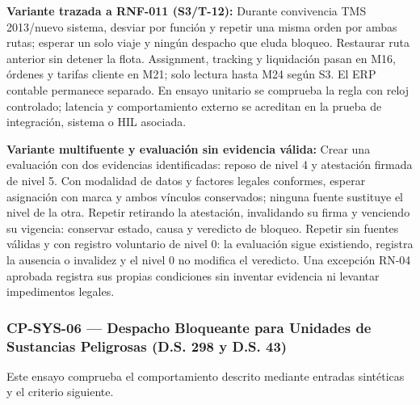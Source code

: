 \par\noindent\textbf{Variante trazada a RNF-011 (S3/T-12):} Durante convivencia TMS 2013/nuevo sistema, desviar por función y repetir una misma orden por ambas rutas; esperar un solo viaje y ningún despacho que eluda bloqueo. Restaurar ruta anterior sin detener la flota. Assignment, tracking y liquidación pasan en M16, órdenes y tarifas cliente en M21; solo lectura hasta M24 según S3. El ERP contable permanece separado. En ensayo unitario se comprueba la regla con reloj controlado; latencia y comportamiento externo se acreditan en la prueba de integración, sistema o HIL asociada.\par



\par\noindent\textbf{Variante multifuente y evaluación sin evidencia válida:} Crear una evaluación con dos evidencias identificadas: reposo de nivel 4 y atestación firmada de nivel 5. Con modalidad de datos y factores legales conformes, esperar asignación con marca y ambos vínculos conservados; ninguna fuente sustituye el nivel de la otra. Repetir retirando la atestación, invalidando su firma y venciendo su vigencia: conservar estado, causa y veredicto de bloqueo. Repetir sin fuentes válidas y con registro voluntario de nivel 0: la evaluación sigue existiendo, registra la ausencia o invalidez y el nivel 0 no modifica el veredicto. Una excepción RN-04 aprobada registra sus propias condiciones sin inventar evidencia ni levantar impedimentos legales.\par


\subsubsection*{CP-SYS-06 — Despacho Bloqueante para Unidades de Sustancias Peligrosas (D.S. 298 y D.S. 43)}\label{sec:9-cp-sys-06}
Este ensayo comprueba el comportamiento descrito mediante entradas sintéticas y el criterio siguiente.

